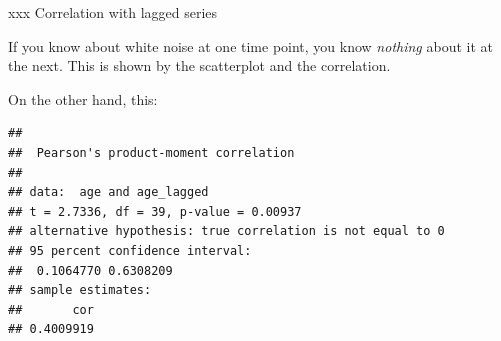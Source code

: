 \documentclass[ignorenonframetext,]{beamer}
\newenvironment{Shaded}{\begin{snugshade}}{\end{snugshade}}
\newcommand{\DataTypeTok}[1]{\textcolor[rgb]{0.13,0.29,0.53}{#1}}
\newcommand{\KeywordTok}[1]{\textcolor[rgb]{0.13,0.29,0.53}{\textbf{#1}}}
\newcommand{\NormalTok}[1]{#1}
\newcommand{\OperatorTok}[1]{\textcolor[rgb]{0.81,0.36,0.00}{\textbf{#1}}}
\newcommand{\StringTok}[1]{\textcolor[rgb]{0.31,0.60,0.02}{#1}}
\begin{document}
\begin{frame}[fragile]{xxx Correlation with lagged series}
\protect\hypertarget{xxx-correlation-with-lagged-series}{}

If you know about white noise at one time point, you know \emph{nothing}
about it at the next. This is shown by the scatterplot and the
correlation.

On the other hand, this:

\small

\begin{Shaded}
\end{Shaded}

\begin{verbatim}
## 
##  Pearson's product-moment correlation
## 
## data:  age and age_lagged
## t = 2.7336, df = 39, p-value = 0.00937
## alternative hypothesis: true correlation is not equal to 0
## 95 percent confidence interval:
##  0.1064770 0.6308209
## sample estimates:
##       cor 
## 0.4009919
\end{verbatim}

\normalsize

\end{frame}
\end{document}
